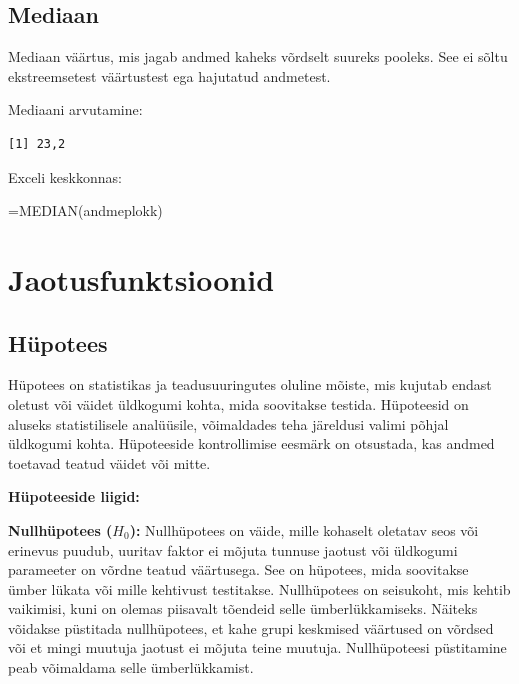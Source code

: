 \documentclass[
]{book}
\newenvironment{Shaded}{\begin{snugshade}}{\end{snugshade}}
\newcommand{\FunctionTok}[1]{\textcolor[rgb]{0.13,0.29,0.53}{\textbf{#1}}}
\newcommand{\NormalTok}[1]{#1}
\newcommand{\SpecialCharTok}[1]{\textcolor[rgb]{0.81,0.36,0.00}{\textbf{#1}}}
\renewenvironment{Shaded} {\begin{snugshade}\footnotesize} {\end{snugshade}}
\theoremstyle{definition}
\theoremstyle{definition}
\theoremstyle{definition}
\theoremstyle{definition}
\theoremstyle{remark}
\begin{document}
\section{Mediaan}\label{mediaan}

Mediaan väärtus, mis jagab andmed kaheks võrdselt suureks pooleks. See ei sõltu ekstreemsetest väärtustest ega hajutatud andmetest.

Mediaani arvutamine:

\begin{Shaded}
\end{Shaded}

\begin{verbatim}
[1] 23,2
\end{verbatim}

Exceli keskkonnas:

\begin{naideExcel}
=MEDIAN(andmeplokk)

\end{naideExcel}

\chapter{Jaotusfunktsioonid}\label{jaotusfunktsioonid}

\section{Hüpotees}\label{huxfcpotees}

Hüpotees on statistikas ja teadusuuringutes oluline mõiste, mis kujutab endast oletust või väidet üldkogumi kohta, mida soovitakse testida. Hüpoteesid on aluseks statistilisele analüüsile, võimaldades teha järeldusi valimi põhjal üldkogumi kohta. Hüpoteeside kontrollimise eesmärk on otsustada, kas andmed toetavad teatud väidet või mitte.

\textbf{Hüpoteeside liigid:}

\textbf{Nullhüpotees (\(H_0\)):} Nullhüpotees on väide, mille kohaselt oletatav seos või erinevus puudub, uuritav faktor ei mõjuta tunnuse jaotust või üldkogumi parameeter on võrdne teatud väärtusega. See on hüpotees, mida soovitakse ümber lükata või mille kehtivust testitakse. Nullhüpotees on seisukoht, mis kehtib vaikimisi, kuni on olemas piisavalt tõendeid selle ümberlükkamiseks. Näiteks võidakse püstitada nullhüpotees, et kahe grupi keskmised väärtused on võrdsed või et mingi muutuja jaotust ei mõjuta teine muutuja. Nullhüpoteesi püstitamine peab võimaldama selle ümberlükkamist.
\end{document}
